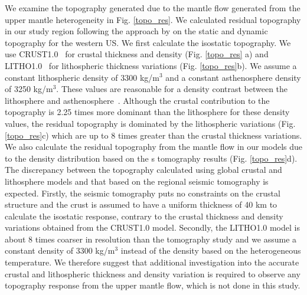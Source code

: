 \documentclass[draft,linenumbers]{agujournal2018}
\begin{document}
    We examine the topography generated due to the mantle flow generated from the upper mantle heterogeneity in Fig. \ref{topo_res}. We calculated residual topography in our study region following the approach by \citet{becker2014static} on the static and dynamic topography for the western US. We first calculate the isostatic topography. We use CRUST1.0~\citep{laske2013update} for crustal thickness and density (Fig. \ref{topo_res} a) and LITHO1.0~\citep{pasyanos2014litho1} for lithospheric thickness variations (Fig. \ref{topo_res}b). We assume a constant lithospheric density of 3300 kg/m$^3$ and a constant asthenosphere density of 3250 kg/m$^3$. These values are reasonable for a density contrast between the lithosphere and asthenosphere~\citep[e.g.,][]{bonnardot2008numerical, ito2011probing}. Although the crustal contribution to the topography is 2.25 times more dominant than the lithosphere for these density values, the residual topography is dominated by the lithospheric variations (Fig. \ref{topo_res}c) which are up to 8 times greater than the crustal thickness variations. We also calculate the residual topography from the mantle flow in our models due to the density distribution based on the \citet{Biryol_2016}s tomography results (Fig. \ref{topo_res}d). The discrepancy between the topography calculated using global crustal and lithosphere models and that based on the regional seismic tomography is expected. Firstly, the seismic tomography puts no constraints on the crustal structure and the crust is assumed to have a uniform thickness of 40 km to calculate the isostatic response, contrary to the crustal thickness and density variations obtained from the CRUST1.0 model. Secondly, the LITHO1.0 model is about 8 times coarser in resolution than the tomography study and we assume a constant density of 3300 kg/m$^3$ instead of the density based on the heterogeneous temperature. We therefore suggest that additional investigation into the accurate crustal and lithospheric thickness and density variation is required to observe any topography response from the upper mantle flow, which is not done in this study.
%
\end{document}
